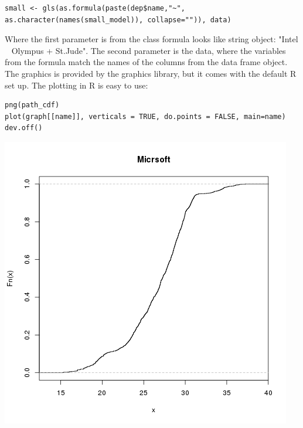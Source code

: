 \documentclass{article}
\begin{document}
\begin{verbatim}
small <- gls(as.formula(paste(dep$name,"~", as.character(names(small_model)), collapse="")), data)
\end{verbatim} 
Where the first parameter is from the class formula looks like string object: "Intel ~ Olympus + St.Jude". The second parameter is the data, where the variables from the formula match the names of the columns from the data frame object.\\
The graphics is provided by the graphics library, but it comes with the default R set up. The plotting in R is easy to use:
\begin{verbatim}
png(path_cdf)
plot(graph[[name]], verticals = TRUE, do.points = FALSE, main=name)
dev.off()
\end{verbatim}
\includegraphics[scale=0.75]{RPlotExample.png}
 
\end{document}
